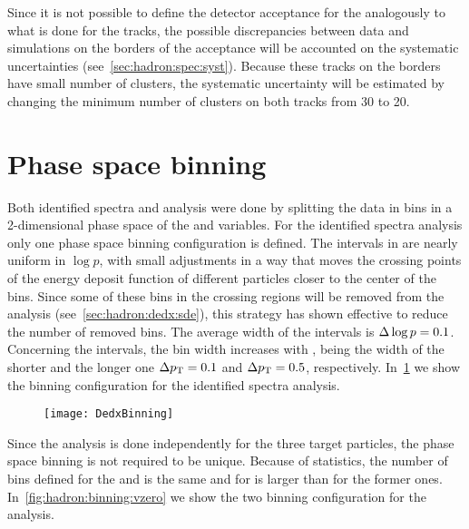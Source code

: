 Since it is not possible to define the detector acceptance for
the \vzeros analogously to what is done for the tracks, the possible
discrepancies between data and simulations on the borders of the acceptance
will be accounted on the systematic uncertainties (see~\cref{sec:hadron:spec:syst}).
Because these tracks on the borders have small number of clusters,
the systematic uncertainty will be estimated by changing the minimum number
of clusters on both tracks from 30 to 20. 


\section{Phase space binning}


Both identified spectra and \vzero analysis were done
by splitting the data in bins in a 2-dimensional
phase space of the \pp and \pT variables. For the
identified spectra analysis only one phase space
binning configuration is defined. The intervals in \pp
are nearly uniform in $\log p$, with small adjustments in a way
that moves the crossing points of the energy deposit function
of different particles closer to the center of the bins.
Since some of these bins in the crossing regions
will be removed from the analysis (see~\cref{sec:hadron:dedx:sde}),
this strategy has shown effective to reduce the number of
removed bins. The average width of the \pp intervals is
$\Delta\log p=0.1$. Concerning the \pT intervals, the bin width
increases with \pT, being the width of the shorter and the longer one
$\Delta p_\text{T}=0.1$ and  $\Delta p_\text{T}=0.5$, respectively.  
In~\cref{fig:hadron:binning:dedx} we show the binning configuration
for the identified spectra analysis.


\begin{figure}[!ht]
  \centering
  \texttt{[image: DedxBinning]}
  \caption{}
  \label{fig:hadron:binning:dedx}
\end{figure}

Since the \vzero analysis is done independently for the three target particles,
the phase space binning is not required to be unique. Because of statistics,
the number of bins defined for the \lamb and \antilamb is the same and
for \kzeros is larger than for the former ones.
In~\cref{fig:hadron:binning:vzero} we show the two
binning configuration for the \vzero analysis.


